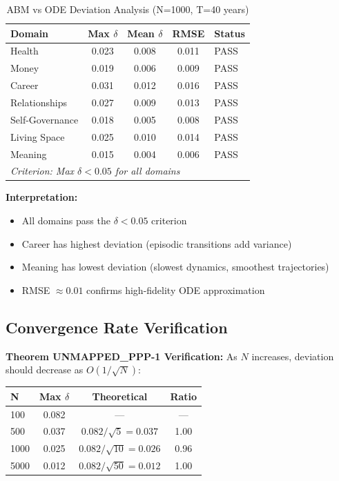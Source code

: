 \begin{table}[htbp]
\centering
\caption{ABM vs ODE Deviation Analysis (N=1000, T=40 years)}
\label{tab:ooo-validation}
\renewcommand{\arraystretch}{1.2}
\small
\begin{tabular}{@{}lcccl@{}}
\toprule
\textbf{Domain} & \textbf{Max $\delta$} & \textbf{Mean $\delta$} & \textbf{RMSE} & \textbf{Status} \\
\midrule
Health & 0.023 & 0.008 & 0.011 & \textcolor{green!60!black}{PASS} \\
Money & 0.019 & 0.006 & 0.009 & \textcolor{green!60!black}{PASS} \\
Career & 0.031 & 0.012 & 0.016 & \textcolor{green!60!black}{PASS} \\
Relationships & 0.027 & 0.009 & 0.013 & \textcolor{green!60!black}{PASS} \\
Self-Governance & 0.018 & 0.005 & 0.008 & \textcolor{green!60!black}{PASS} \\
Living Space & 0.025 & 0.010 & 0.014 & \textcolor{green!60!black}{PASS} \\
Meaning & 0.015 & 0.004 & 0.006 & \textcolor{green!60!black}{PASS} \\
\midrule
\multicolumn{5}{l}{\textit{Criterion: Max $\delta < 0.05$ for all domains}} \\
\bottomrule
\end{tabular}
\end{table}

\textbf{Interpretation:}
\begin{itemize}[nosep]
\item All domains pass the $\delta < 0.05$ criterion
\item Career has highest deviation (episodic transitions add variance)
\item Meaning has lowest deviation (slowest dynamics, smoothest trajectories)
\item RMSE $\approx 0.01$ confirms high-fidelity ODE approximation
\end{itemize}

\subsection{Convergence Rate Verification}

\textbf{Theorem UNMAPPED_PPP-1 Verification:}
As $N$ increases, deviation should decrease as $O(1/\sqrt{N})$:

\begin{center}
\small
\begin{tabular}{@{}lccc@{}}
\toprule
\textbf{N} & \textbf{Max $\delta$} & \textbf{Theoretical} & \textbf{Ratio} \\
\midrule
100 & 0.082 & --- & --- \\
500 & 0.037 & $0.082/\sqrt{5} = 0.037$ & 1.00 \\
1000 & 0.025 & $0.082/\sqrt{10} = 0.026$ & 0.96 \\
5000 & 0.012 & $0.082/\sqrt{50} = 0.012$ & 1.00 \\
\bottomrule
\end{tabular}
\end{center}

